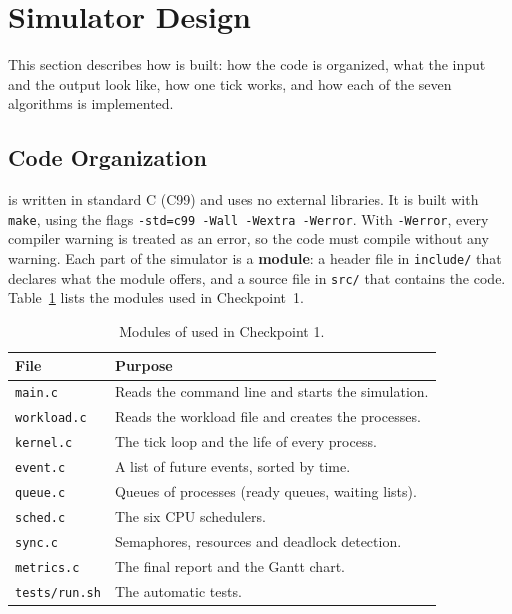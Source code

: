 \section{Simulator Design}
\label{sec:design}
This section describes how \ossim{} is built: how the code is organized, what the input and the output look like, how one tick works, and how each of the seven algorithms is implemented.

\subsection{Code Organization}
\ossim{} is written in standard C (C99) and uses no external libraries. It is built with \texttt{make}, using the flags \texttt{-std=c99 -Wall -Wextra -Werror}. With \texttt{-Werror}, every compiler warning is treated as an error, so the code must compile without any warning. Each part of the simulator is a \textbf{module}: a header file in \texttt{include/} that declares what the module offers, and a source file in \texttt{src/} that contains the code. Table~\ref{tab:modules} lists the modules used in Checkpoint~1.

\begin{table}[H]
\centering
\caption{Modules of \ossim{} used in Checkpoint 1.}
\label{tab:modules}
\begin{tabular}{p{}p{}}
\toprule
File & Purpose \\
\midrule
\texttt{main.c} & Reads the command line and starts the simulation. \\
\texttt{workload.c} & Reads the workload file and creates the processes. \\
\texttt{kernel.c} & The tick loop and the life of every process. \\
\texttt{event.c} & A list of future events, sorted by time. \\
\texttt{queue.c} & Queues of processes (ready queues, waiting lists). \\
\texttt{sched.c} & The six CPU schedulers. \\
\texttt{sync.c} & Semaphores, resources and deadlock detection. \\
\texttt{metrics.c} & The final report and the Gantt chart. \\
\texttt{tests/run.sh} & The automatic tests. \\
\bottomrule
\end{tabular}
\end{table}

